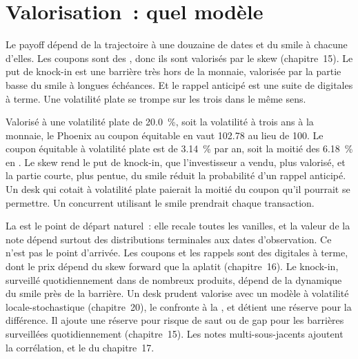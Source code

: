 \section{Valorisation~: quel modèle}

Le payoff dépend de la trajectoire à une douzaine de dates et du smile à chacune d'elles. Les coupons sont des , donc ils sont
valorisés par le skew (chapitre~15). Le put de knock-in est une barrière très hors de la monnaie, valorisée par la partie basse du smile à
longues échéances. Et le rappel anticipé est une suite de digitales à terme. Une volatilité plate se trompe sur les trois dans le même
sens.

\begin{example}\label{ex:dv:autocallables:flat}
Valorisé à une volatilité plate de 20.0~\%, soit la volatilité à trois ans à la monnaie, le Phoenix au coupon équitable en  vaut 102.78
au lieu de 100. Le coupon équitable à volatilité plate est de 3.14~\% par an, soit la moitié des 6.18~\% en . Le skew rend
le put de knock-in, que l'investisseur a vendu, plus valorisé, et la partie courte, plus pentue, du smile réduit la probabilité d'un
rappel anticipé. Un desk qui cotait à volatilité plate paierait la moitié du coupon qu'il pourrait se permettre. Un concurrent utilisant le smile
prendrait chaque transaction.
\end{example}

La  est le point de départ naturel~: elle recale toutes les vanilles, et la valeur de la note dépend surtout des
distributions terminales aux dates d'observation. Ce n'est pas le point d'arrivée. Les coupons et les rappels sont des digitales à terme, dont le prix
dépend du skew forward que la  aplatit (chapitre~16). Le knock-in, surveillé quotidiennement dans de nombreux produits, dépend de la dynamique du
smile près de la barrière. Un desk prudent valorise avec un modèle à volatilité locale-stochastique (chapitre~20), le confronte à la , et détient une
réserve pour la différence. Il ajoute une réserve pour risque de saut ou de gap pour les barrières surveillées quotidiennement (chapitre~15). Les notes multi-sous-jacents ajoutent la corrélation, et le  du chapitre~17.

